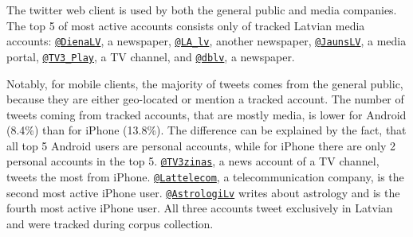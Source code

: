 \documentclass{IOS-Book-Article}
\makeatletter
\newcommand{\hl}[1]{#1}
\newcommand{\sn}[1]{\href{https://twitter.com/#1}{\texttt{@#1}}}
\makeatother
\begin{document}
The twitter web client is used by both the general public and media companies. The top 5 of most active accounts consists only of tracked Latvian media accounts: \sn{DienaLV}, a newspaper, \sn{LA\_lv}, another newspaper, \sn{JaunsLV}, a media portal, \sn{TV3\_Play}, a TV channel, and \sn{dblv}, a newspaper.

Notably, for mobile clients, the majority of tweets comes from the general public, because they are either geo-located or mention a tracked account. The number of tweets coming from tracked accounts, that are mostly media, is lower for Android \hl{(8.4\%)} than for iPhone \hl{(13.8\%)}. The difference can be explained by the fact, that all top 5 Android users are personal accounts, while for iPhone there are only 2 personal accounts in the top 5. \sn{TV3zinas}, a news account of a TV channel, tweets the most from iPhone. \sn{Lattelecom}, a telecommunication company, is the second most active iPhone user. \sn{AstrologiLv} writes about astrology and is the fourth most active iPhone user. All three accounts tweet exclusively in Latvian and were tracked during corpus collection.




\end{document}
